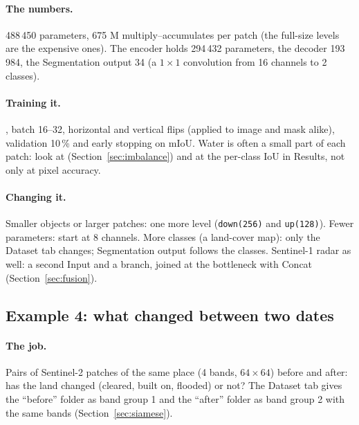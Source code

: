 \paragraph{The numbers.} 488\,450 parameters, 675 M multiply--accumulates per patch (the full-size levels are the expensive ones). The
encoder holds 294\,432 parameters, the decoder 193\,984, the Segmentation output 34 (a $1\times1$ convolution from 16 channels to 2
classes).

\paragraph{Training it.} , batch 16--32, horizontal and vertical flips (applied to image and mask alike), validation
10\,\% and early stopping on mIoU. Water is often a small part of each patch: look at 
(Section~\ref{sec:imbalance}) and at the per-class IoU in Results, not only at pixel accuracy.

\paragraph{Changing it.} Smaller objects or larger patches: one more level (\texttt{down(256)} and \texttt{up(128)}). Fewer
parameters: start at 8 channels. More classes (a land-cover map): only the Dataset tab changes; Segmentation output follows the classes.
Sentinel-1 radar as well: a second Input and a branch, joined at the bottleneck with Concat (Section~\ref{sec:fusion}).

\subsection{Example 4: what changed between two dates}
\label{sec:build-ex4}
\paragraph{The job.} Pairs of Sentinel-2 patches of the same place (4 bands, $64\times64$) before and after: has the land changed
(cleared, built on, flooded) or not? The Dataset tab gives the ``before'' folder as band group 1 and the ``after'' folder as band group 2
with the same bands (Section~\ref{sec:siamese}).

